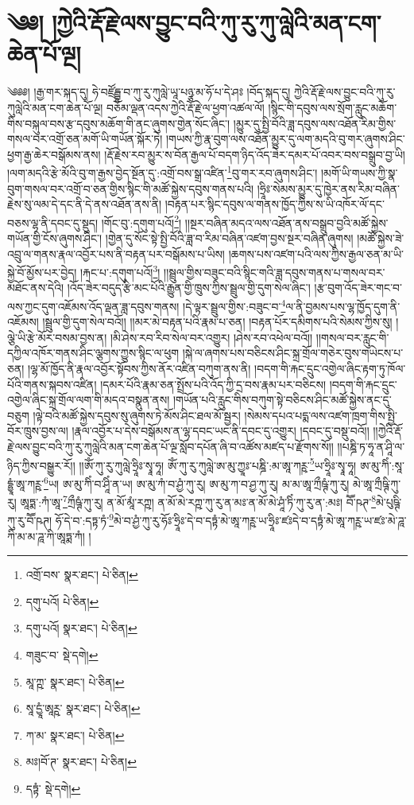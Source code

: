 \setcounter{footnote}{0} 
\chapter{༄༅། །ཀྱེའི་རྡོ་རྗེ་ལས་བྱུང་བའི་ཀུ་རུ་ཀུ་ལླེའི་མན་ངག་ཆེན་པོ་ལྔ།}༄༅༅། །རྒྱ་གར་སྐད་དུ། ཧེ་བཛྲོདྦྷ་བ་ཀུ་རུ་ཀུལླེ་ཡཱ་པཉྩ་མ་ཧོ་པ་དེ་ཤཿ །བོད་སྐད་དུ། ཀྱེའི་རྡོ་རྗེ་ལས་བྱུང་བའི་ཀུ་རུ་ཀུལླེའི་མན་ངག་ཆེན་པོ་ལྔ། བཅོམ་ལྡན་འདས་ཀྱེའི་རྡོ་རྗེ་ལ་ཕྱག་འཚལ་ལོ། །སྙིང་གི་དབུས་ལས་སྲོག་རླུང་མཆོག་གིས་བསྐུལ་བས་རྩ་དབུས་མཆོག་གི་ནང་ཞུགས་གྱེན་སོང་ཞིང་། །མྱུར་དུ་སྤྱི་བོའི་ཟླ་དབུས་ལས་འཐོན་རིམ་གྱིས་གསལ་བར་འགྲོ་ཅན་མགོ་ཡི་གཡོན་སྐོར་ཏེ། །གཡས་ཀྱི་རྣ་བུག་ལས་འཐོན་མྱུར་དུ་ལག་མདའི་བུ་གར་ཞུགས་ཤིང་ཕྱག་རྒྱ་ཆེར་བསྒོམས་ནས། །རྡོ་རྗེས་རབ་མྱུར་ས་བོན་རྒྱལ་པོ་བདག་ཉིད་འོད་ཟེར་དམར་པོ་འབར་བས་བསྒྲུབ་བྱ་ཡི། །ལག་མདའི་རྩེ་མོའི་བུ་ག་རྒྱས་བྱེད་སྔོན་དུ་:འགྲོ་བས་སྒྲ་འཛིན་\footnote{འགྲོ་བས་  སྣར་ཐང་།  པེ་ཅིན། }བུ་གར་རབ་ཞུགས་ཤིང་། །མགོ་ཡི་གཡས་ཀྱི་སྣ་བུག་གསལ་བར་འགྲོ་བ་ཅན་གྱིས་སྙིང་གི་མཚོ་སྐྱེས་དབུས་གནས་པའི། །ཧྲཱིཿ་སེམས་མྱུར་དུ་ཁྱེར་ནས་རིམ་བཞིན་རྗེས་སུ་ལམ་དེ་དང་ནི་དེ་ནས་འཐོན་ནས་ནི། །བརྟན་པར་སྙིང་དབུས་ལ་གནས་ཁྱོད་ཀྱིས་ས་ཡི་འཁོར་ལོ་དང་བཅས་ལྷ་ནི་དབང་དུ་སྡུད། །གོང་བུ་:དགུག་པའོ།\footnote{དགུ་པའོ།  པེ་ཅིན། }། །།སྔར་བཞིན་མདའ་ལས་འཐོན་ནས་བསྒྲུབ་བྱའི་མཚོ་སྐྱེས་གཡོན་གྱི་ངོས་ཞུགས་ཤིང་། །གྱེན་དུ་སོང་སྟེ་སྤྱི་བོའི་ཟླ་བ་རིམ་བཞིན་འཛག་བྱས་སྔར་བཞིན་ཞུགས། །མཚོ་སྐྱེས་ཟེ་འབྲུ་ལ་གནས་རྣལ་འབྱོར་པས་ནི་བརྟན་པར་བསྒོམས་པ་ཡིས། །ཆགས་པས་འཛག་པའི་ལས་ཀྱིས་རྒྱལ་ཅན་མ་ཡི་སྐྱེ་བོ་མྱོས་པར་བྱེད། །རྐང་པ་:དགུག་པའོ།\footnote{དགུ་པའོ།  སྣར་ཐང་།  པེ་ཅིན། }། །།སྦྲུལ་གྱིས་བཟུང་བའི་སྙིང་གའི་ཟླ་དབུས་གནས་པ་གསལ་བར་མཐོང་ནས་དེའི། །འོད་ཟེར་བདུད་རྩི་མང་པོའི་རྒྱུན་གྱི་ཁྲུས་ཀྱིས་སྦྲུལ་གྱི་དུག་སེལ་ཞིང་། །རྩ་བུག་འོད་ཟེར་གང་བ་ལས་ཀྱང་དུག་འཇོམས་འོད་ལྡན་ཟླ་དབུས་གནས། །དེ་ལྟར་སྦྲུལ་གྱིས་:བཟུང་བ་\footnote{གཟུང་བ་  སྡེ་དགེ། }ལ་ནི་བྱམས་པས་ལྷ་ཁྱོད་དུག་ནི་འཇོམས། །སྦྲུལ་གྱི་དུག་སེལ་བའོ།། །།མར་མེ་བརྟན་པའི་རྣམ་པ་ཅན། །བརྟན་པོར་དམིགས་པའི་སེམས་ཀྱིས་སུ། །ལྕེ་ཡི་རྩེ་མོར་བསམ་བྱས་ན། །མི་ཤེས་རབ་རིབ་སེལ་བར་འགྱུར། །ཤེས་རབ་འཕེལ་བའོ།། །།གསལ་བར་རླུང་གི་དཀྱིལ་འཁོར་གནས་ཤིང་ལྕགས་ཀྱུས་སྙིང་ལ་ཕུག །སྐེ་ལ་ཞགས་པས་བཅིངས་ཤིང་སྐྲ་གྲོལ་གཅེར་བུས་གཡེངས་པ་ཅན། །ལྷ་མོ་ཁྱོད་ནི་རྣལ་འབྱོར་སྟོབས་ཀྱིས་ནོར་འཛིན་བཀུག་ནས་ནི། །བདག་གི་རྐང་དྲུང་འགྱེལ་ཞིང་རྟག་ཏུ་ཁོལ་པོའི་གནས་སྐབས་འཛིན། །དམར་པོའི་རྣམ་ཅན་སྤྲོས་པའི་འོད་ཀྱི་དྲ་བས་རྣམ་པར་བཅིངས། །བདག་གི་རྐང་དྲུང་འགྱེལ་ཞིང་སྐྲ་གྲོལ་ལག་གི་མདའ་བསྣུན་ནས། །གཡོན་པའི་རླུང་གིས་བཀུག་སྟེ་བཅིངས་ཤིང་མཚོ་སྐྱེས་ནང་དུ་བཅུག །ལྟེ་བའི་མཚོ་སྐྱེས་དབུས་སུ་ཞུགས་ཏེ་མོས་ཤིང་ཐལ་མོ་སྦྱར། །སེམས་དཔའ་པདྨ་ལས་འཛག་ཁྲག་གིས་སྤྱི་བོར་ཁྲུས་བྱས་ལ། །རྣལ་འབྱོར་པ་དེས་བསྒོམས་ན་ལྷ་དབང་ཡང་ནི་དབང་དུ་འགྱུར། །དབང་དུ་བསྡུ་བའོ།། །།ཀྱེའི་རྡོ་རྗེ་ལས་བྱུང་བའི་ཀུ་རུ་ཀུལླེའི་མན་ངག་ཆེན་པོ་ལྔ་སློབ་དཔོན་ཞི་བ་འཚོས་མཛད་པ་རྫོགས་སོ།། །།པཎྜི་ཏ་ཧཱ་ན་ཤཱི་ལ་ཉིད་ཀྱིས་བསྒྱུར་རོ།། །།ཨོཾ་ཀུ་རུ་ཀུལླེ་ཧྲཱིཿ་སྭཱ་ཧཱ། ཨོཾ་ཀུ་རུ་ཀུལླེ་ཨ་མུ་ཀྱཱཿ་པཎྜི་:མ་ཨཱ་ཀཪྵ་\footnote{མཱ་ཀྵ་  སྣར་ཐང་།  པེ་ཅིན། }ཡ་ཧྲཱིཿ་སྭཱ་ཧཱ། ཨ་མུ་ཀིཾ་:སཱ་དྷྱཱཾ་ཨཱ་ཀཪྵ་\footnote{སཱ་དྱཱཾ་ཨཱཪྵ་  སྣར་ཐང་།  པེ་ཅིན། }ཡ། ཨ་མུ་ཀིཾ་བ་ཤཱིཾ་ན་ཡ། ཨ་མུ་ཀཾ་བ་ཤྱཾ་ཀུ་རུ། ཨ་མུ་ཀ་བ་ཤྱ་ཀུ་རུ། མ་མ་ཨཱ་ཀྲྀཥྚཾ་ཀུ་རུ། མེ་ཨཱ་ཀྲྀཥྚི་ཀུ་རུ། ཨཱཏྨ་:ཀཾ་ཨཱ་\footnote{ཀ་མ་  སྣར་ཐང་།  པེ་ཅིན། }ཀྲྀཥྚཾ་ཀུ་རུ། ན་མོ་མཱཾ་རཀྵ། ན་མོ་མེ་རཀྵ་ཀུ་རུ་ན་མཿ་ན་མོ་མེ་ཤཱཾ་ཏིཾ་ཀུ་རུ་ན་:མཿ། བཽ་ཥཊ་\footnote{མཿ།བོ་ཊ་  སྣར་ཐང་།  པེ་ཅིན། }མེ་པུཥྚི་ཀུ་རུ་བཽ་ཥཊ། ཧོ་དེ་བ་:དཏྟ་ཏཾ་\footnote{དཏྟཾ་  སྡེ་དགེ། }མེ་བ་ཤྱཾ་ཀུ་རུ་ཧོཿ་ཧྲཱིཿ་དེ་བ་དཏྟཾ་མེ་ཨཱ་ཀཪྵ་ཡ་ཧྲཱིཿ་ཛཿདེ་བ་དཏྟཾ་མེ་ཨཱ་ཀཪྵ་ཡ་ཛཿ་མེ་ཌཱ་ཀི་མ་མ་ཌཱ་ཀི་ཨཱཏྨ་ཀཾ། ། 